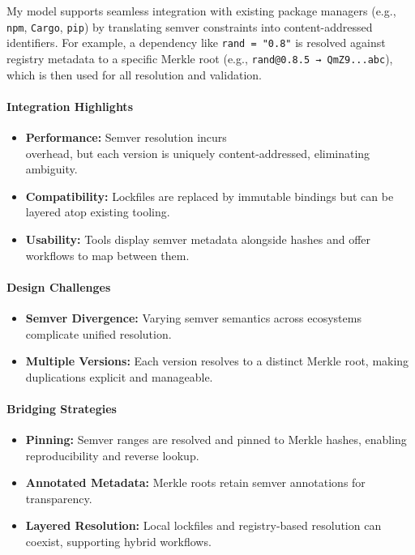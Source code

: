 \documentclass[sigplan,screen]{acmart}
\begin{document}
My model supports seamless integration with existing package managers (e.g., \texttt{npm}, \texttt{Cargo}, \texttt{pip}) by translating semver constraints into content-addressed identifiers. For example, a dependency like \texttt{rand = "0.8"} is resolved against registry metadata to a specific Merkle root (e.g., \texttt{rand@0.8.5 → QmZ9...abc}), which is then used for all resolution and validation.

\paragraph{Integration Highlights}
\begin{itemize}
	\item \textbf{Performance:} Semver resolution incurs \\overhead, but each version is uniquely content-addressed, eliminating ambiguity.
	\item \textbf{Compatibility:} Lockfiles are replaced by immut\-able bindings but can be layered atop existing tooling.
	\item \textbf{Usability:} Tools display semver metadata alongside hashes and offer workflows to map between them.
\end{itemize}

\paragraph{Design Challenges}
\begin{itemize}
	\item \textbf{Semver Divergence:} Varying semver semantics across ecosystems complicate unified resolution.
	\item \textbf{Multiple Versions:} Each version resolves to a distinct Merkle root, making duplications explicit and manageable.
\end{itemize}

\paragraph{Bridging Strategies}
\begin{itemize}
	\item \textbf{Pinning:} Semver ranges are resolved and pinned to Merkle hashes, enabling reproducibility and reverse lookup.
	\item \textbf{Annotated Metadata:} Merkle roots retain semver annotations for transparency.
	\item \textbf{Layered Resolution:} Local lockfiles and registry-based resolution can coexist, supporting hybrid workflows.
\end{itemize}
\end{document}
